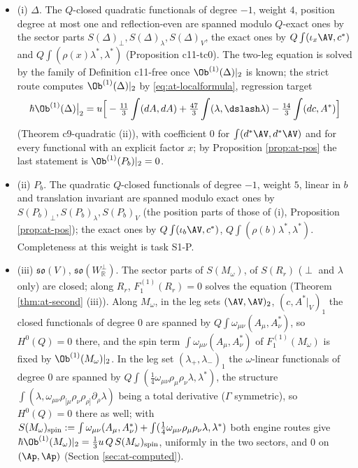 \begin{proposition}
\label{prop:at-two}
\leavevmode
\begin{itemize}
\item (i) $\Delta$. The $Q$-closed quadratic functionals of degree $-1$, weight $4$, position degree at most one and reflection-even are spanned modulo $Q$-exact ones by the sector parts $S(\Delta)_\perp,S(\Delta)_\lambda,S(\Delta)_V$, the exact ones by $Q\int(\iota_x\AV,c^*)$ and $Q\int(\rho(x)\lambda^*,\lambda^*)$ (Proposition c11-tc0). The two-leg equation is solved by the family of Definition c11-free once $\Ob^{(1)}(\Delta)|_2$ is known; the strict route computes $\Ob^{(1)}(\Delta)|_2$ by \eqref{eq:at-localformula}, regression target
\begin{equation}
\hbar\Ob^{(1)}(\Delta)\big|_2=u\Big[-\tfrac{11}3\int(dA,dA)+\tfrac{47}3\int(\lambda,\dslash\lambda)-\tfrac{14}3\int(dc,A^*)\Big]
\label{eq:at-reg2}
\end{equation}
(Theorem c9-quadratic (ii)), with coefficient $0$ for $\int(d^*\AV,d^*\AV)$ and for every functional with an explicit factor $x$; by Proposition \ref{prop:at-pos} the last statement is $\Ob^{(1)}(P_b)|_2=0$.
\item (ii) $P_b$. The quadratic $Q$-closed functionals of degree $-1$, weight $5$, linear in $b$ and translation invariant are spanned modulo exact ones by $S(P_b)_\perp,S(P_b)_\lambda,S(P_b)_V$ (the position parts of those of (i), Proposition \ref{prop:at-pos}); the exact ones by $Q\int(\iota_b\AV,c^*)$, $Q\int(\rho(b)\lambda^*,\lambda^*)$. Completeness at this weight is task S1-P.
\item (iii) $\mathfrak{so}(V)$, $\mathfrak{so}(W^\perp_{\mathbb R})$. The sector parts of $S(M_\omega)$, of $S(R_r)$ ($\perp$ and $\lambda$ only) are closed; along $R_r$, $F_1^{(1)}(R_r)=0$ solves the equation (Theorem \ref{thm:at-second} (iii)). Along $M_\omega$, in the leg sets $(\AV,\AV)_2$, $(c,A^*|_V)_1$ the closed functionals of degree $0$ are spanned by $Q\int\omega_{\mu\nu}(A_\mu,A^*_\nu)$, so $H^0(Q)=0$ there, and the spin term $\int\omega_{\mu\nu}(A_\mu,A^*_\nu)$ of $F_1^{(1)}(M_\omega)$ is fixed by $\Ob^{(1)}(M_\omega)|_2$. In the leg set $(\lambda_+,\lambda_-)_1$ the $\omega$-linear functionals of degree $0$ are spanned by $Q\int(\tfrac14\omega_{\mu\nu}\rho_\mu\rho_\nu\lambda,\lambda^*)$, the structure $\int(\lambda,\omega_{\mu\nu}\rho_{[\mu}\rho_\nu\rho_{\rho]}\partial_\rho\lambda)$ being a total derivative ($\Gamma$ symmetric), so $H^0(Q)=0$ there as well; with $S(M_\omega)_{\rm spin}:=\int\omega_{\mu\nu}(A_\mu,A^*_\nu)+\int(\tfrac14\omega_{\mu\nu}\rho_\mu\rho_\nu\lambda,\lambda^*)$ both engine routes give $\hbar\Ob^{(1)}(M_\omega)|_2=\tfrac13u\,Q\,S(M_\omega)_{\rm spin}$, uniformly in the two sectors, and $0$ on $(\Ap,\Ap)$ (Section \ref{sec:at-computed}).

\end{itemize}
\end{proposition}
